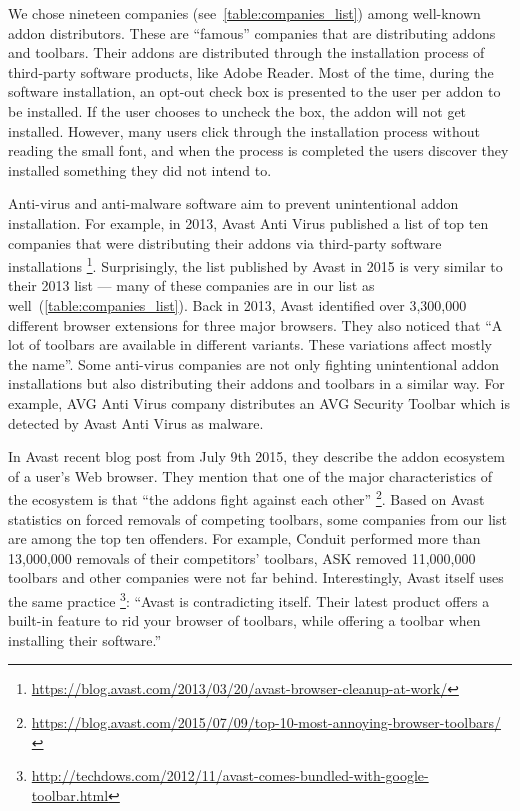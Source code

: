 \documentclass[11pt,oneside]{book}
\let\Oldsection\section
\renewcommand{\section}{\FloatBarrier\Oldsection}
\begin{document}

We chose nineteen companies (see~\autoref{table:companies_list}) among well-known addon distributors. These are ``famous'' companies that are distributing addons and toolbars. Their addons are distributed through the installation process of third-party software products, like Adobe Reader. Most of the time, during the software installation, an opt-out check box is presented to the user per addon to be installed. If the user chooses to uncheck the box, the addon will not get installed. However, many users click through the installation process without reading the small font, and when the process is completed the users discover they installed something they did not intend to. 

Anti-virus and anti-malware software aim to prevent unintentional addon installation. For example, in 2013, Avast Anti Virus published a list of top ten companies that were distributing their addons via third-party software installations \footnote{\url{https://blog.avast.com/2013/03/20/avast-browser-cleanup-at-work/}}. Surprisingly, the list published by Avast in 2015 is very similar to their 2013 list --- many of these companies are in our list as well~(\autoref{table:companies_list}). Back in 2013, Avast identified over 3,300,000 different browser extensions for three major browsers. They also noticed that ``A lot of toolbars are available in different variants. These variations affect mostly the name''. Some anti-virus companies are not only fighting unintentional addon installations but also distributing their addons and toolbars in a similar way. For example, AVG Anti Virus company distributes an AVG Security Toolbar which is detected by Avast Anti Virus as malware. 

In Avast recent blog post from July 9th 2015, they describe the addon ecosystem of a user's Web browser. They mention that one of the major characteristics of the ecosystem is that ``the addons fight against each other'' \footnote{\url{https://blog.avast.com/2015/07/09/top-10-most-annoying-browser-toolbars/}}.
Based on Avast statistics on forced removals of competing toolbars, some companies from our list are among the top ten offenders. For example, Conduit performed more than 13,000,000 removals of their competitors' toolbars, ASK removed 11,000,000 toolbars and other companies were not far behind. Interestingly, Avast itself uses the same practice \footnote{\url{http://techdows.com/2012/11/avast-comes-bundled-with-google-toolbar.html}}: ``Avast is contradicting itself. Their latest product offers a built-in feature to rid your browser of toolbars, while offering a toolbar when installing their software.''
\end{document}

